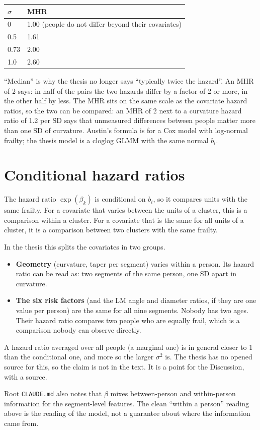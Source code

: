 \documentclass[11pt]{article}
\begin{document}
\begin{center}
\begin{tabular}{ll}
\toprule
$\sigma$ & MHR \\
\midrule
0 & 1.00 (people do not differ beyond their covariates) \\
0.5 & 1.61 \\
0.73 & 2.00 \\
1.0 & 2.60 \\
\bottomrule
\end{tabular}
\end{center}

``Median'' is why the thesis no longer says ``typically twice the hazard''. An MHR of 2 says: in
half of the pairs the two hazards differ by a factor of 2 or more, in the other half by less. The
MHR sits on the same scale as the covariate hazard ratios, so the two can be compared: an MHR of 2
next to a curvature hazard ratio of 1.2 per SD says that unmeasured differences between people
matter more than one SD of curvature. Austin's formula is for a Cox model with log-normal frailty;
the thesis model is a cloglog GLMM with the same normal $b_i$.

\section{Conditional hazard ratios}

\begin{thesisline}
The hazard ratio $\exp(\beta_k)$ is conditional on $b_i$, so it compares units with the same
frailty. For a covariate that varies between the units of a cluster, this is a comparison within a
cluster. For a covariate that is the same for all units of a cluster, it is a comparison between two
clusters with the same frailty.
\end{thesisline}

\begin{mine}
In the thesis this splits the covariates in two groups.
\begin{itemize}
  \item \textbf{Geometry} (curvature, taper per segment) varies within a person. Its hazard ratio
        can be read as: two segments of the same person, one SD apart in curvature.
  \item \textbf{The six risk factors} (and the LM angle and diameter ratios, if they are one value
        per person) are the same for all nine segments. Nobody has two ages. Their hazard ratio
        compares two people who are equally frail, which is a comparison nobody can observe
        directly.
\end{itemize}
A hazard ratio averaged over all people (a marginal one) is in general closer to 1 than the
conditional one, and more so the larger $\sigma^2$ is. The thesis has no opened source for this, so
the claim is not in the text. It is a point for the Discussion, with a source.

Root \texttt{CLAUDE.md} also notes that $\beta$ mixes between-person and within-person information
for the segment-level features. The clean ``within a person'' reading above is the reading of the
model, not a guarantee about where the information came from.
\end{mine}
\end{document}
